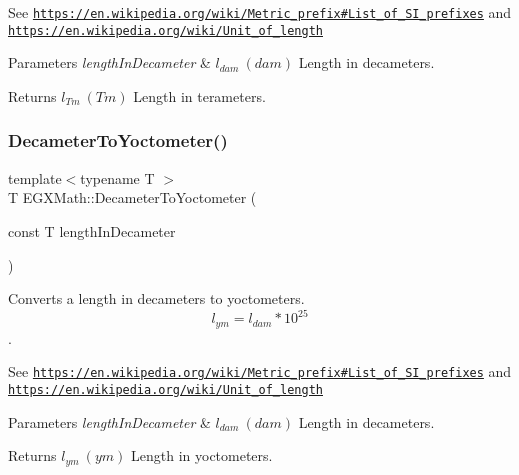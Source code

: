 See \href{https://en.wikipedia.org/wiki/Metric_prefix#List_of_SI_prefixes}{\tt https\+://en.\+wikipedia.\+org/wiki/\+Metric\+\_\+prefix\#\+List\+\_\+of\+\_\+\+S\+I\+\_\+prefixes} and \href{https://en.wikipedia.org/wiki/Unit_of_length}{\tt https\+://en.\+wikipedia.\+org/wiki/\+Unit\+\_\+of\+\_\+length} 
\begin{DoxyParams}{Parameters}
{\em length\+In\+Decameter} & $ l_{dam}\ (dam)$ Length in decameters. \\
\hline
\end{DoxyParams}
\begin{DoxyReturn}{Returns}
$ l_{Tm}\ (Tm)$ Length in terameters. 
\end{DoxyReturn}
\mbox{\label{group___e_g_x_math-_conversions-_length_conversions-_decameter-_s_i_ga1e90c34b56ee230eec4a3e00a3fedbde}} 
\subsubsection{\texorpdfstring{Decameter\+To\+Yoctometer()}{DecameterToYoctometer()}}
{\footnotesize\ttfamily template$<$typename T $>$ \\
T E\+G\+X\+Math\+::\+Decameter\+To\+Yoctometer (\begin{DoxyParamCaption}\item[{const T}]{length\+In\+Decameter }\end{DoxyParamCaption})}



Converts a length in decameters to yoctometers. \[ l_{ym}=l_{dam} * 10^{25} \]. 

See \href{https://en.wikipedia.org/wiki/Metric_prefix#List_of_SI_prefixes}{\tt https\+://en.\+wikipedia.\+org/wiki/\+Metric\+\_\+prefix\#\+List\+\_\+of\+\_\+\+S\+I\+\_\+prefixes} and \href{https://en.wikipedia.org/wiki/Unit_of_length}{\tt https\+://en.\+wikipedia.\+org/wiki/\+Unit\+\_\+of\+\_\+length} 
\begin{DoxyParams}{Parameters}
{\em length\+In\+Decameter} & $ l_{dam}\ (dam)$ Length in decameters. \\
\hline
\end{DoxyParams}
\begin{DoxyReturn}{Returns}
$ l_{ym}\ (ym)$ Length in yoctometers. 
\end{DoxyReturn}
\mbox{\label{group___e_g_x_math-_conversions-_length_conversions-_decameter-_s_i_gaa10c7c9c4e75fc2d647d4f85ff8d801b}} 

